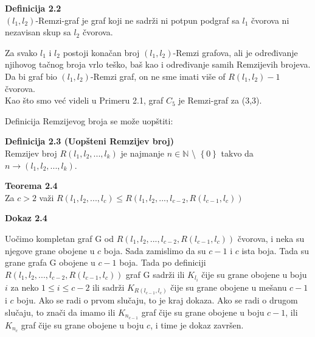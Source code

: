 \documentclass[12pt,a4paper]{article}
\begin{document}
	\begin{mdframed}
	{\noindent\fontsize{12pt}{12pt}\textbf{Definicija 2.2}}\\
	$(l_1, l_2)$-Remzi-graf je graf koji ne sadrži ni potpun podgraf sa $l_1$ čvorova ni nezavisan skup sa $l_2$ čvorova.
	
	\end{mdframed}
	
	Za svako $l_1$ i $l_2$ postoji konačan broj $(l_1, l_2)$-Remzi grafova, ali je određivanje njihovog tačnog broja vrlo teško, baš kao i određivanje samih Remzijevih brojeva. Da bi graf bio $(l_1, l_2)$-Remzi graf, on ne sme imati više of $R(l_1, l_2)-1$ čvorova.\\
	Kao što smo već videli u Primeru 2.1, graf $C_5$ je Remzi-graf za (3,3).
	
	
	

	\noindent Definicija Remzijevog broja se može uopštiti: 	
	
	\begin{mdframed}
	\vspace{0.4em}
	
	{\fontsize{12pt}{12pt}\textbf{Definicija 2.3 (Uopšteni Remzijev broj)}}
	\\
	
	\vspace{-0.8em}
	Remzijev broj $R(l_{1}, l_{2}, ... , l_{k})$ je najmanje $n \in \mathbb{N}$ \textbackslash {} $\left\lbrace 0\right\rbrace $ takvo da $n\rightarrow(l_{1}, l_{2},  ... , l_{k})$.
	\end{mdframed}
	
	{\noindent\fontsize{12pt}{12pt}\textbf{Teorema 2.4}}
	\vspace{0.4em}
	\\
	Za $c>2$ važi $R(l_1, l_2, ... , l_c) \leq R(l_1, l_2, ... , l_{c-2}, R(l_{c-1}, l_c))$
	
	\vspace{0.3em}
	
	{\noindent\fontsize{12pt}{12pt}\textbf{Dokaz 2.4}}
	\vspace{0.4em}
	
	\noindent Uočimo kompletan graf G od $R(l_1, l_2, ... , l_{c-2}, R(l_{c-1}, l_c))$ čvorova, i neka su njegove grane obojene u $c$ boja. Sada zamislimo da su $c-1$ i $c$ ista boja. Tada su grane grafa G obojene u $c-1$ boja. Tada po definiciji  $R(l_1, l_2, ... , l_{c-2}, R(l_{c-1}, l_c))$ graf G sadrži ili $K_{l_i}$ čije su grane obojene u boju $i$ za neko $1 \leq i \leq c-2$ ili sadrži $K_{R(l_{c-1}, l_c)}$ čije su grane obojene u mešanu $c-1$ i $c$ boju. Ako se radi o prvom slučaju, to je kraj dokaza. Ako se radi o drugom slučaju, to znači da imamo ili $K_{n_{c-1}}$ graf čije su grane obojene u boju $c-1$, ili $K_{n_{c}}$ graf čije su grane obojene u boju $c$, i time je dokaz završen.
	
\end{document}
